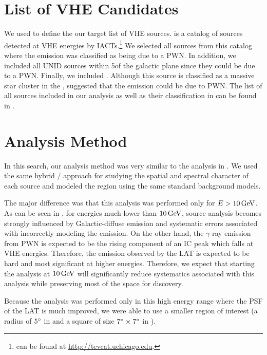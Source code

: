 \section{List of \ac{VHE}  Candidates}



We used \tevcat to define the our target list of \ac{VHE} sources.
\tevcat is a catalog of sources detected at
\ac{VHE} energies by \acp{IACT}.\footnote{\tevcat can be found at
\url{http://tevcat.uchicago.edu}.}  We selected all sources from
this catalog where the emission was classified as being due to a
\ac{PWN}. In addition, we included all \ac{UNID} sources within
5\degree of the galactic plane since they could be due to a \ac{PWN}.  Finally,
we included . Although this source is classified as a massive
star cluster in the \tevcat, 
\cite{de-naurois_2013a_galactic-h.e.s.s.}
suggested that the emission could be due to \ac{PWN}. The list of all sources
included in our analysis as well as their classification in \tevcat can
be found in .

\section{Analysis Method}

In this search, our analysis method was very similar to the analysis
in . We used the same hybrid \pointlike/\gtlike
approach for studying the spatial and spectral character of each source
and modeled the region using the same standard background models.

The major difference was that this analysis
was performed only for $E>10\,\text{GeV}$.  As can be seen in
, for energies much lower than $10\,\text{GeV}$,
source analysis becomes strongly influenced by Galactic-diffuse
emission and systematic errors associated with incorrectly modeling
the emission. On the other hand, the $\gamma$-ray emission from \ac{PWN}
is expected to be the rising component of an \ac{IC} peak which falls
at \ac{VHE} energies. Therefore, the emission observed by the \ac{LAT} is
expected to be hard and most significant at higher energies. Therefore,
we expect that starting the analysis  at $10\,\text{GeV}$ will
significantly reduce systematics associated with this analysis while
preserving most of the space for discovery.

Because the analysis was performed only in this high energy range where
the \ac{PSF} of the \ac{LAT} is much improved, we were able to use
a smaller region of interest (a radius of $5^\circ$ in \pointlike 
and a square of size $7^\circ\times7^\circ$ in \gtlike).

